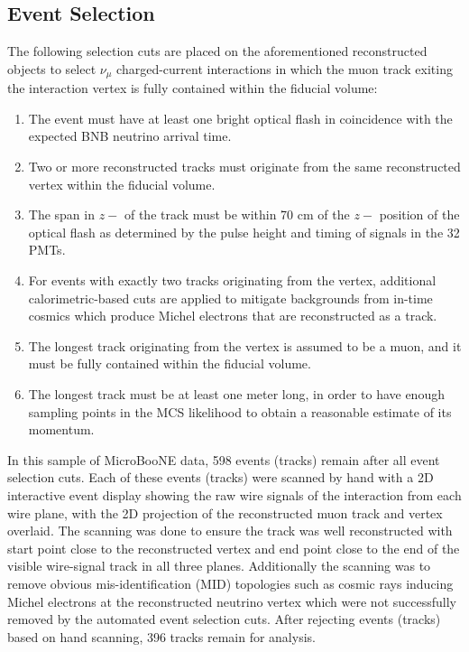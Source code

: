 \documentclass[a4paper,11pt]{article}
\begin{document}
\subsection{Event Selection}
The following selection cuts are placed on the aforementioned reconstructed objects to select $\nu_\mu$ charged-current interactions in which the muon track exiting the interaction vertex is fully contained within the fiducial volume:
\begin{enumerate}
\item The event must have at least one bright optical flash in coincidence with the expected BNB neutrino arrival time.
\item Two or more reconstructed tracks must originate from the same reconstructed vertex within the fiducial volume.
\item The span in $z-$ of the track must be within 70 cm of the $z-$ position of the optical flash as determined by the pulse height and timing of signals in the 32 PMTs.
\item For events with exactly two tracks originating from the vertex, additional calorimetric-based cuts are applied to mitigate backgrounds from in-time cosmics which produce Michel electrons that are reconstructed as a track.
\item The longest track originating from the vertex is assumed to be a muon, and it must be fully contained within the fiducial volume.
\item The longest track must be at least one meter long, in order to have enough sampling points in the MCS likelihood to obtain a reasonable estimate of its momentum.
\end{enumerate}

In this sample of MicroBooNE data, 598 events (tracks) remain after all event selection cuts. Each of these events (tracks) were scanned by hand with a 2D interactive event display showing the raw wire signals of the interaction from each wire plane, with the 2D projection of the reconstructed muon track and vertex overlaid. The scanning was done to ensure the track was well reconstructed with start point close to the reconstructed vertex and end point close to the end of the visible wire-signal track in all three planes. Additionally the scanning was to remove obvious mis-identification (MID) topologies such as cosmic rays inducing Michel electrons at the reconstructed neutrino vertex which were not successfully removed by the automated event selection cuts. After rejecting events (tracks) based on hand scanning, 396 tracks remain for analysis.
\end{document}
